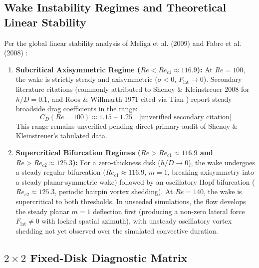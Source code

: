 \documentclass[11pt,a4paper]{article}
\begin{document}
\subsection{Wake Instability Regimes and Theoretical Linear Stability}
Per the global linear stability analysis of Meliga et al. (2009) \cite{meliga2009} and Fabre et al. (2008) \cite{fabre2008}:
\begin{enumerate}
    \item \textbf{Subcritical Axisymmetric Regime ($Re < Re_{c1} \approx 116.9$):} At $Re = 100$, the wake is strictly steady and axisymmetric ($\sigma < 0$, $F_{\mathrm{lat}} \to 0$). Secondary literature citations (commonly attributed to Shenoy \& Kleinstreuer 2008 \cite{shenoy2008} for $h/D = 0.1$, and Roos \& Willmarth 1971 \cite{roos1971} cited via Tian \cite{tian2019}) report steady broadside drag coefficients in the range:
    \begin{equation}
    C_D(Re = 100) \approx 1.15 \text{ -- } 1.25 \quad \text{[unverified secondary citation]}
    \end{equation}
    This range remains unverified pending direct primary audit of Shenoy \& Kleinstreuer's tabulated data.
    \item \textbf{Supercritical Bifurcation Regimes ($Re > Re_{c1} \approx 116.9$ and $Re > Re_{c2} \approx 125.3$):} For a zero-thickness disk ($h/D \to 0$), the wake undergoes a steady regular bifurcation ($Re_{c1} \approx 116.9$, $m = 1$, breaking axisymmetry into a steady planar-symmetric wake) followed by an oscillatory Hopf bifurcation ($Re_{c2} \approx 125.3$, periodic hairpin vortex shedding). At $Re = 140$, the wake is supercritical to both thresholds. In unseeded simulations, the flow develops the steady planar $m = 1$ deflection first (producing a non-zero lateral force $F_{\mathrm{lat}} \neq 0$ with locked spatial azimuth), with unsteady oscillatory vortex shedding not yet observed over the simulated convective duration.
\end{enumerate}

\subsection{\texorpdfstring{$2 \times 2$}{2 x 2} Fixed-Disk Diagnostic Matrix}
\end{document}
